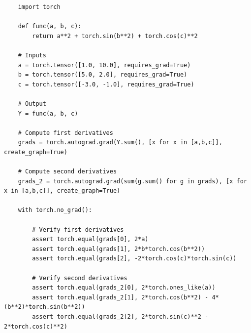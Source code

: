 \begin{solution}

\begin{code}
	\begin{Verbatim}
	import torch

	def func(a, b, c):
	    return a**2 + torch.sin(b**2) + torch.cos(c)**2

	# Inputs
	a = torch.tensor([1.0, 10.0], requires_grad=True)
	b = torch.tensor([5.0, 2.0], requires_grad=True)
	c = torch.tensor([-3.0, -1.0], requires_grad=True)

	# Output
	Y = func(a, b, c)

	# Compute first derivatives
	grads = torch.autograd.grad(Y.sum(), [x for x in [a,b,c]], create_graph=True)

	# Compute second derivatives
	grads_2 = torch.autograd.grad(sum(g.sum() for g in grads), [x for x in [a,b,c]], create_graph=True)

	with torch.no_grad():

	    # Verify first derivatives
	    assert torch.equal(grads[0], 2*a)
	    assert torch.equal(grads[1], 2*b*torch.cos(b**2))
	    assert torch.equal(grads[2], -2*torch.cos(c)*torch.sin(c))
	    
	    # Verify second derivatives
	    assert torch.equal(grads_2[0], 2*torch.ones_like(a))
	    assert torch.equal(grads_2[1], 2*torch.cos(b**2) - 4*(b**2)*torch.sin(b**2))
	    assert torch.equal(grads_2[2], 2*torch.sin(c)**2 - 2*torch.cos(c)**2)
    \end{Verbatim}
\end{code}
\end{solution}

